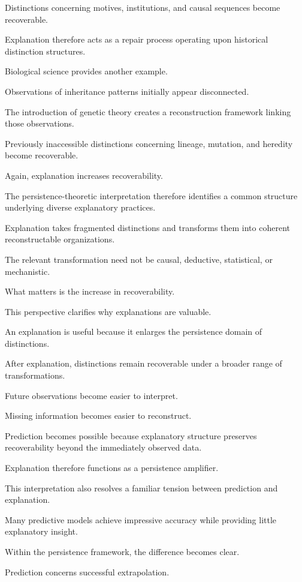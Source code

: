 \documentclass[12pt,oneside]{article}
\theoremstyle{definition}
\begin{document}
Distinctions concerning motives, institutions, and causal sequences become recoverable.

Explanation therefore acts as a repair process operating upon historical distinction structures.

Biological science provides another example.

Observations of inheritance patterns initially appear disconnected.

The introduction of genetic theory creates a reconstruction framework linking those observations.

Previously inaccessible distinctions concerning lineage, mutation, and heredity become recoverable.

Again, explanation increases recoverability.

The persistence-theoretic interpretation therefore identifies a common structure underlying diverse explanatory practices.

Explanation takes fragmented distinctions and transforms them into coherent reconstructable organizations.

The relevant transformation need not be causal, deductive, statistical, or mechanistic.

What matters is the increase in recoverability.

This perspective clarifies why explanations are valuable.

An explanation is useful because it enlarges the persistence domain of distinctions.

After explanation, distinctions remain recoverable under a broader range of transformations.

Future observations become easier to interpret.

Missing information becomes easier to reconstruct.

Prediction becomes possible because explanatory structure preserves recoverability beyond the immediately observed data.

Explanation therefore functions as a persistence amplifier.

This interpretation also resolves a familiar tension between prediction and explanation.

Many predictive models achieve impressive accuracy while providing little explanatory insight.

Within the persistence framework, the difference becomes clear.

Prediction concerns successful extrapolation.
\end{document}
